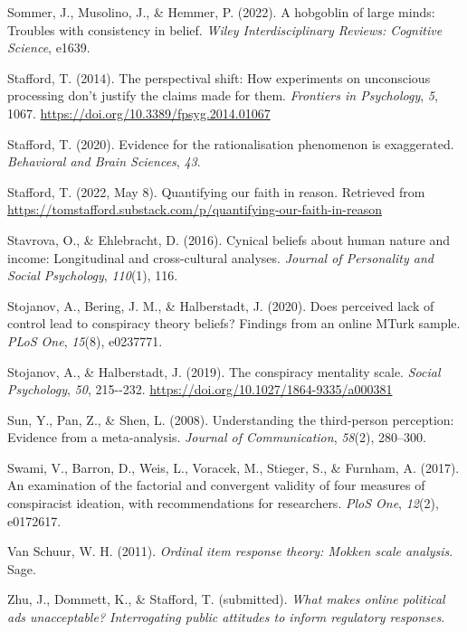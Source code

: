 \documentclass[
  ,jou,floatsintext]{apa6}
\newlength{\cslhangindent}
\newlength{\cslentryspacingunit} %
\newenvironment{CSLReferences}[2] %
 {%
  \setlength{\parindent}{0pt}
  \ifodd #1
  \let\oldpar\par
  \def\par{\hangindent=\cslhangindent\oldpar}
  \fi
  \setlength{\parskip}{#2\cslentryspacingunit}
 }%
 {}
\begin{document}
\begin{CSLReferences}{1}{0}
\leavevmode{}%
Sommer, J., Musolino, J., \& Hemmer, P. (2022). A hobgoblin of large minds: Troubles with consistency in belief. \emph{Wiley Interdisciplinary Reviews: Cognitive Science}, e1639.

\leavevmode{}%
Stafford, T. (2014). The perspectival shift: How experiments on unconscious processing don't justify the claims made for them. \emph{Frontiers in Psychology}, \emph{5}, 1067. \url{https://doi.org/10.3389/fpsyg.2014.01067}

\leavevmode{}%
Stafford, T. (2020). Evidence for the rationalisation phenomenon is exaggerated. \emph{Behavioral and Brain Sciences}, \emph{43}.

\leavevmode{}%
Stafford, T. (2022, May 8). Quantifying our faith in reason. Retrieved from \url{https://tomstafford.substack.com/p/quantifying-our-faith-in-reason}

\leavevmode{}%
Stavrova, O., \& Ehlebracht, D. (2016). Cynical beliefs about human nature and income: Longitudinal and cross-cultural analyses. \emph{Journal of Personality and Social Psychology}, \emph{110}(1), 116.

\leavevmode{}%
Stojanov, A., Bering, J. M., \& Halberstadt, J. (2020). Does perceived lack of control lead to conspiracy theory beliefs? Findings from an online MTurk sample. \emph{PLoS One}, \emph{15}(8), e0237771.

\leavevmode{}%
Stojanov, A., \& Halberstadt, J. (2019). The conspiracy mentality scale. \emph{Social Psychology}, \emph{50}, 215-\/-232. \url{https://doi.org/10.1027/1864-9335/a000381}

\leavevmode{}%
Sun, Y., Pan, Z., \& Shen, L. (2008). Understanding the third-person perception: Evidence from a meta-analysis. \emph{Journal of Communication}, \emph{58}(2), 280--300.

\leavevmode{}%
Swami, V., Barron, D., Weis, L., Voracek, M., Stieger, S., \& Furnham, A. (2017). An examination of the factorial and convergent validity of four measures of conspiracist ideation, with recommendations for researchers. \emph{PloS One}, \emph{12}(2), e0172617.

\leavevmode{}%
Van Schuur, W. H. (2011). \emph{Ordinal item response theory: Mokken scale analysis}. Sage.

\leavevmode{}%
Zhu, J., Dommett, K., \& Stafford, T. (submitted). \emph{What makes online political ads unacceptable? Interrogating public attitudes to inform regulatory responses}.

\end{CSLReferences}
\end{document}
